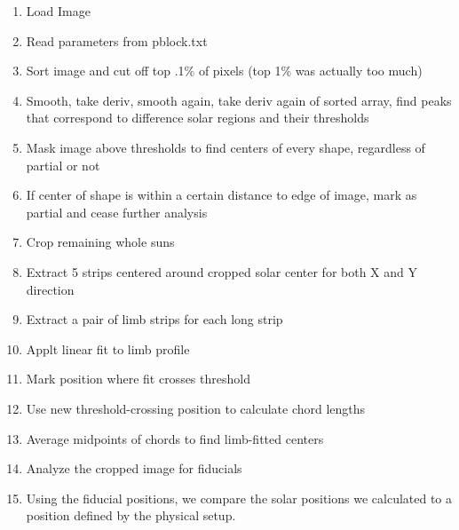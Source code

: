 \documentclass[10pt]{scrartcl}
\begin{document}
\begin{enumerate}
    \item Load Image
    \item Read parameters from pblock.txt
    \item Sort image and cut off top .1\% of pixels (top 1\% was actually too much)
    \item Smooth, take deriv, smooth again, take deriv again of sorted array, find peaks that correspond to difference solar regions and their thresholds
    \item Mask image above thresholds to find centers of every shape, regardless of partial or not
    \item If center of shape is within a certain distance to edge of image, mark as partial and cease further analysis
    \item Crop remaining whole suns
    \item Extract 5 strips centered around cropped solar center for both X and Y direction
    \item Extract a pair of limb strips for each long strip
    \item Applt linear fit to limb profile
    \item Mark position where fit crosses threshold 
    \item Use new threshold-crossing position to calculate chord lengths
    \item Average midpoints of chords to find limb-fitted centers
    \item Analyze the cropped image for fiducials
    \item Using the fiducial positions, we compare the solar positions we calculated to a position defined by the physical setup.
\end{enumerate}
\end{document}
